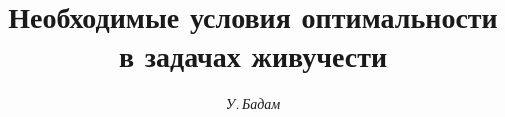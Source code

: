 




% 


\newcommand{\mes}{\operatorname{mes}}


\newcommand{\grad}{\operatorname{grad}}







\setcounter{page}{18}















\author{\it У.\,Бадам}




\title{Необходимые условия оптимальности \\


в задачах живучести}





\date{}




\pagestyle{plain} %







\maketitle


\label{begin}









